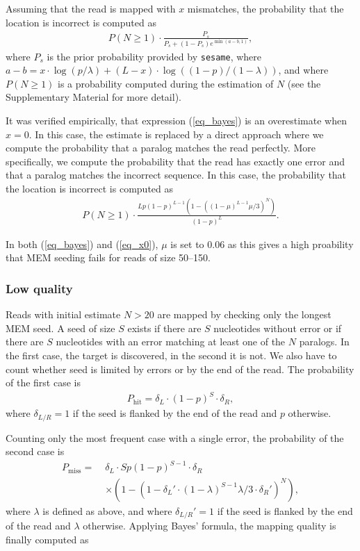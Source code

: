 \documentclass[a4,center,fleqn]{NAR}
\begin{document}
Assuming that the read is mapped with $x$ mismatches, the probability that
the location is incorrect is computed as
\begin{align}
\label{eq_bayes}
P(N \geq 1) \cdot \frac{P_s}{P_s + (1-P_s)e^{\min(a-b,1)}},
\end{align}
where $P_s$ is the prior probability provided by \texttt{sesame}, where
$a-b=x \cdot \log(p/\lambda)+(L-x) \cdot \log((1-p)/(1-\lambda))$, and
where $P(N \geq 1)$ is a probability computed during the estimation of $N$ (see
the Supplementary Material for more detail).

It was verified empirically, that expression (\ref{eq_bayes}) is an
overestimate when $x = 0$. In this case, the estimate is replaced by a
direct approach where we compute the probability that a paralog matches
the read perfectly. More specifically, we compute the probability that the
read has exactly one error and that a paralog matches the incorrect
sequence. In this case, the probability that the location is incorrect is
computed as
\begin{align}
\label{eq_x0}
P(N \geq 1) \cdot \frac{Lp(1-p)^{L-1}
\left(1-\left((1-\mu)^{L-1}\mu/3\right)^N\right)}{(1-p)^L}.
\end{align}

In both (\ref{eq_bayes}) and (\ref{eq_x0}), $\mu$ is set to 0.06 as this
gives a high proability that MEM seeding fails for reads of size 50--150.


\subsubsection{Low quality} Reads with initial estimate $N > 20$ are
mapped by checking only the longest MEM seed. A seed of size $S$ exists if
there are $S$ nucleotides without error or if there are $S$ nucleotides
with an error matching at least one of the $N$ paralogs. In the first
case, the target is discovered, in the second it is not. We also have to
count whether seed is limited by errors or by the end of the read.
The probability of the first case is
\begin{align*}
P_{\text{hit}} = \delta_L \cdot (1-p)^S \cdot \delta_R,
\end{align*}
where $\delta_{L/R} = 1$ if the seed is flanked by the end of the read and $p$
otherwise.

Counting only the most frequent case with a single error, the probability
of the second case is
\begin{equation*}
\begin{split}
P_{\text{miss}} = \; &\delta_L \cdot Sp(1-p)^{S-1} \cdot \delta_R  \\
   &\times \left(1- \left( 1-\delta_L' \cdot(1-\lambda)^{S-1}\lambda/3
   \cdot \delta_R'\right)^N \right),
\end{split}
\end{equation*}
where $\lambda$ is defined as above, and where $\delta_{L/R}' = 1$ if the
seed is flanked by the end of the read and $\lambda$ otherwise. Applying
Bayes' formula, the mapping quality is finally computed as
\end{document}
